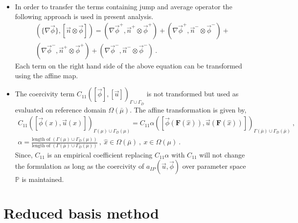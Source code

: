 \documentclass[graybox]{svmult}
\begin{document}
\begin{itemize}
\item In order to transfer the terms containing jump and average operator the following approach is used in present analysis.
\begin{equation*}\label{jump_average_term_split}
\begin{split}
\left(\lbrace \nabla \overrightarrow{\phi} \rbrace , \left[ \overrightarrow{n} \otimes \overrightarrow{\phi}  \right]  \right) = \left( \nabla \overrightarrow{\phi}^+ , \overrightarrow{n}^+ \otimes \overrightarrow{\phi}^+ \right) + \left( \nabla \overrightarrow{\phi}^+ , \overrightarrow{n}^- \otimes \overrightarrow{\phi}^- \right) + \\ 
\left( \nabla \overrightarrow{\phi}^- , \overrightarrow{n}^+ \otimes \overrightarrow{\phi}^+ \right) + \left( \nabla \overrightarrow{\phi}^- , \overrightarrow{n}^- \otimes \overrightarrow{\phi}^- \right) \ .
\end{split}
\end{equation*}
Each term on the right hand side of the above equation can be transformed using the affine map. 

\item The coercivity term $C_{11}\left( [\overrightarrow{\phi}],[\overrightarrow{u}] \right)_{\Gamma \cup \Gamma_D}$ is not transformed but used as evaluated on reference domain $\Omega(\bar{\mu})$. The affine transformation is given by,
\begin{equation*}
\begin{split}
C_{11}\left( [\overrightarrow{\phi}(x),\overrightarrow{u}(x)] \right)_{\Gamma(\mu) \cup \Gamma_D(\mu)} = C_{11} \alpha \left( [\overrightarrow{\phi}(\bm{F}(\hat{x})),\overrightarrow{u}(\bm{F}(\hat{x}))] \right)_{\Gamma(\bar{\mu}) \cup \Gamma_D(\bar{\mu})} \ , \\
\alpha = \frac{\text{length of }\left( \Gamma(\mu) \cup \Gamma_D(\mu)\right)}{\text{length of }\left( \Gamma(\bar{\mu}) \cup \Gamma_D(\bar{\mu})\right)} \ , \ \hat{x} \in \Omega(\bar{\mu}) \ , \ x \in \Omega(\mu) \ .
\end{split}
\end{equation*}
Since, $C_{11}$ is an empirical coefficient replacing $C_{11} \alpha$ with $C_{11}$ will not change the formulation as long as the coercivity of $a_{IP}(\overrightarrow{u},\overrightarrow{\phi}) $ over parameter space $\mathbb{P}$ is maintained.
\end{itemize}

\section{Reduced basis method}\label{rb_section}
\end{document}
